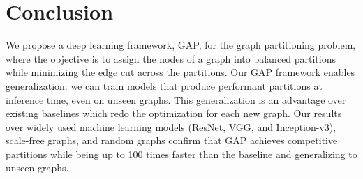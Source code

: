 \documentclass[10pt,twocolumn]{article}
\begin{document}
 \vspace{-0.1in}
\section{Conclusion}
\label{sec:conc}
We propose a deep learning framework, GAP, for the graph partitioning problem, where the objective is to assign the nodes of a graph into balanced partitions while minimizing the edge cut across the partitions. Our GAP framework enables generalization: we can train models that produce performant partitions at inference time, even on unseen graphs. This generalization is an advantage over existing baselines which redo the optimization for each new graph. Our results over widely used machine learning models (ResNet, VGG, and Inception-v3), scale-free graphs, and random graphs confirm that GAP achieves competitive partitions while being up to 100 times faster than the baseline and generalizing to unseen graphs. 





\end{document}
